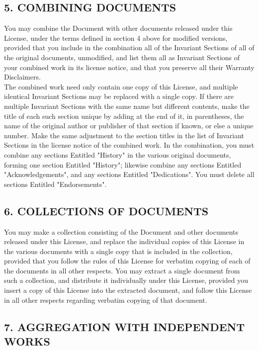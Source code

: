 \subsection{5. COMBINING DOCUMENTS}



You may combine the Document with other documents released under this License, under the terms defined in section 4 above for modified versions, provided that you include in the combination all of the Invariant Sections of all of the original documents, unmodified, and list them all as Invariant Sections of your combined work in its license notice, and that you preserve all their Warranty Disclaimers.\\
The combined work need only contain one copy of this License, and multiple identical Invariant Sections may be replaced with a single copy. If there are multiple Invariant Sections with the same name but different contents, make the title of each such section unique by adding at the end of it, in parentheses, the name of the original author or publisher of that section if known, or else a unique number. Make the same adjustment to the section titles in the list of Invariant Sections in the license notice of the combined work.
In the combination, you must combine any sections Entitled "History" in the various original documents, forming one section Entitled "History"; likewise combine any sections Entitled "Acknowledgements", and any sections Entitled "Dedications". You must delete all sections Entitled "Endorsements".

\subsection{6. COLLECTIONS OF DOCUMENTS}


You may make a collection consisting of the Document and other documents released under this License, and replace the individual copies of this License in the various documents with a single copy that is included in the collection, provided that you follow the rules of this License for verbatim copying of each of the documents in all other respects.
You may extract a single document from such a collection, and distribute it individually under this License, provided you insert a copy of this License into the extracted document, and follow this License in all other respects regarding verbatim copying of that document.

\subsection{7. AGGREGATION WITH INDEPENDENT WORKS}


